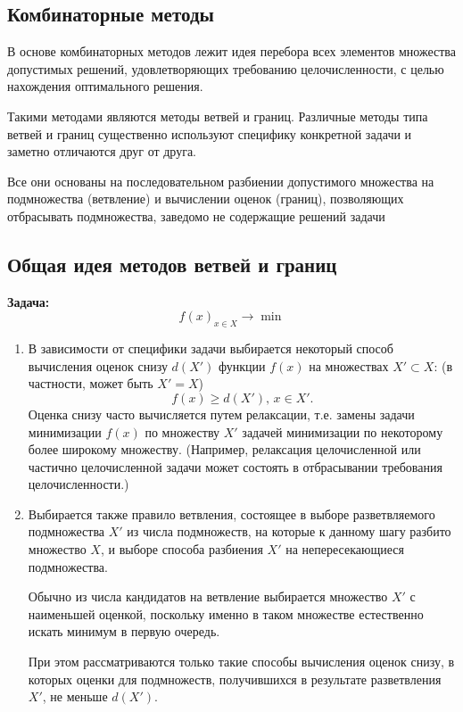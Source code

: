 \documentclass[17pt]{extarticle}
\begin{document}
\subsection{Комбинаторные методы}
В основе комбинаторных методов лежит идея
перебора всех элементов множества допустимых
решений, удовлетворяющих требованию
целочисленности, с целью нахождения
оптимального решения.

Такими методами являются методы ветвей и границ.
Различные методы типа ветвей и границ существенно
используют специфику конкретной задачи и заметно
отличаются друг от друга.

Все они основаны на последовательном разбиении
допустимого множества на подмножества (ветвление) и
вычислении оценок (границ), позволяющих отбрасывать
подмножества, заведомо не содержащие решений задачи

\subsection{Общая идея методов ветвей и границ}
\textbf{Задача:}
\[
    f(x)_{x \in X} \rightarrow \min
\]
\begin{enumerate}
    \item В зависимости от специфики задачи выбирается некоторый способ вычисления оценок
          снизу \( d(X') \) функции \( f(x) \) на множествах \( X' \subset X \):
          (в частности, может быть \( X' = X \))
          \[
              f(x) \geq d(X'), \, x \in X'.
          \]
          Оценка снизу часто вычисляется путем релаксации,
          т.е. замены задачи минимизации \( f(x) \) по множеству \( X' \) задачей минимизации по некоторому более широкому множеству.
          (Например, релаксация целочисленной или частично целочисленной задачи может состоять в отбрасывании требования целочисленности.)

    \item Выбирается также правило ветвления, состоящее в выборе разветвляемого подмножества \( X' \) из числа подмножеств,
          на которые к данному шагу разбито множество \( X \), и выборе способа разбиения \( X' \) на непересекающиеся подмножества.

          Обычно из числа кандидатов на ветвление выбирается множество \( X' \) с наименьшей оценкой,
          поскольку именно в таком множестве естественно искать минимум в первую очередь.

          При этом рассматриваются только такие способы вычисления оценок снизу, в которых оценки для подмножеств,
          получившихся в результате разветвления \( X' \), не меньше \( d(X') \).
\end{enumerate}
\end{document}
